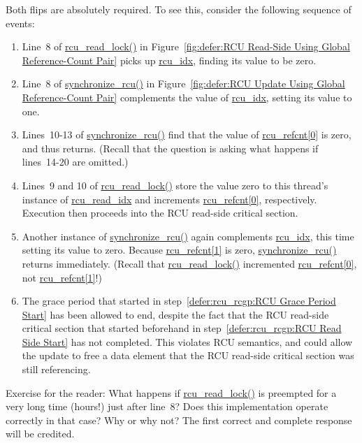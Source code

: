 	Both flips are absolutely required.
	To see this, consider the following sequence of events:
	\begin{enumerate}
	\item	Line~8 of \url{rcu_read_lock()} in
		Figure~\ref{fig:defer:RCU Read-Side Using Global Reference-Count Pair}
		picks up \url{rcu_idx}, finding its value to be zero.
	\item	Line~8 of \url{synchronize_rcu()} in
		Figure~\ref{fig:defer:RCU Update Using Global Reference-Count Pair}
		complements the value of \url{rcu_idx}, setting its
		value to one.
	\item	Lines~10-13 of \url{synchronize_rcu()} find that the
		value of \url{rcu_refcnt[0]} is zero, and thus
		returns.
		(Recall that the question is asking what happens if
		lines~14-20 are omitted.)
	\item	Lines~9 and 10 of \url{rcu_read_lock()} store the
		value zero to this thread's instance of \url{rcu_read_idx}
		and increments \url{rcu_refcnt[0]}, respectively.
		Execution then proceeds into the RCU read-side critical
		section.
		\label{defer:rcu_rcgp:RCU Read Side Start}
	\item	Another instance of \url{synchronize_rcu()} again complements
		\url{rcu_idx}, this time setting its value to zero.
		Because \url{rcu_refcnt[1]} is zero, \url{synchronize_rcu()}
		returns immediately.
		(Recall that \url{rcu_read_lock()} incremented
		\url{rcu_refcnt[0]}, not \url{rcu_refcnt[1]}!)
		\label{defer:rcu_rcgp:RCU Grace Period Start}
	\item	The grace period that started in
		step~\ref{defer:rcu_rcgp:RCU Grace Period Start}
		has been allowed to end, despite
		the fact that the RCU read-side critical section
		that started beforehand in
		step~\ref{defer:rcu_rcgp:RCU Read Side Start}
		has not completed.
		This violates RCU semantics, and could allow the update
		to free a data element that the RCU read-side critical
		section was still referencing.
	\end{enumerate}

	Exercise for the reader: What happens if \url{rcu_read_lock()}
	is preempted for a very long time (hours!) just after
	line~8?
	Does this implementation operate correctly in that case?
	Why or why not?
	The first correct and complete response will be credited.


